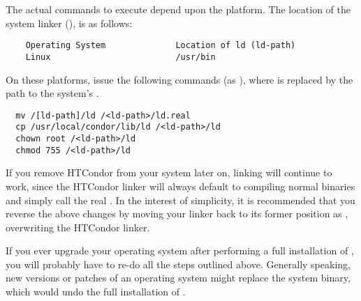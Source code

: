 The actual commands to execute depend upon the platform.
The location of the system linker (), is as follows:
\begin{verbatim}
	Operating System              Location of ld (ld-path)
	Linux                         /usr/bin
\end{verbatim}

On these platforms, issue the following commands (as ), where
 is replaced by the path to the system's .
\begin{verbatim}
  mv /[ld-path]/ld /<ld-path>/ld.real
  cp /usr/local/condor/lib/ld /<ld-path>/ld
  chown root /<ld-path>/ld
  chmod 755 /<ld-path>/ld
\end{verbatim}

If you remove HTCondor from your system later on, linking will continue
to work, since the HTCondor linker will always default to compiling
normal binaries and simply call the real .  In the interest of
simplicity, it is recommended that you reverse the above changes by
moving your  linker back to its former position as ,
overwriting the HTCondor linker.

\Note If you ever upgrade your operating system after performing a
full installation of , you will probably have to re-do
all the steps outlined above.
Generally speaking, new versions or patches of an operating system
might replace the system  binary, which would undo the
full installation of .

